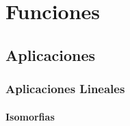 \chapter{Funciones}
\label{ss_classes}



\section{Aplicaciones}
\label{}


\subsection{Aplicaciones Lineales}

\subsubsection{Isomorfias}
